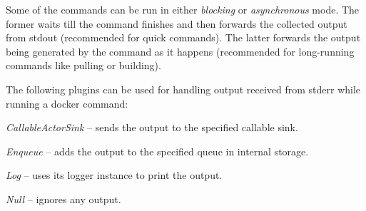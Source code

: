 \documentclass[a4paper]{book}
\begin{document}
Some of the commands can be run in either \textit{blocking} or \textit{asynchronous} mode. The former waits till
the command finishes and then forwards the collected output from stdout (recommended for quick commands). The latter
forwards the output being generated by the command as it happens (recommended for long-running commands like pulling
or building).

\noindent The following plugins can be used for handling output received from stderr while running a docker command:
\begin{tight_itemize}
  \item \textit{CallableActorSink} -- sends the output to the specified callable sink.
  \item \textit{Enqueue} -- adds the output to the specified queue in internal storage.
  \item \textit{Log} -- uses its logger instance to print the output.
  \item \textit{Null} -- ignores any output.
\end{tight_itemize}



\end{document}
